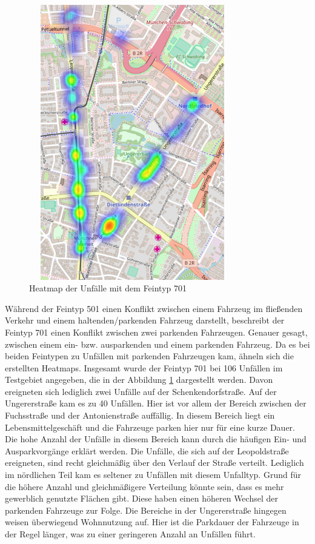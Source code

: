 \begin{savenotes}
	\begin{figure}[H]
		\centering
		\includegraphics[width=9cm,height=12cm]{figures/HM_701}
		\caption[Heatmap der Unfälle mit dem Feintyp 701]{Heatmap der Unfälle mit dem Feintyp 701}\label{fig:Heatmap_701}
	\end{figure}
\end{savenotes}

Während der Feintyp 501 einen Konflikt zwischen einem Fahrzeug im fließenden Verkehr und einem haltenden/parkenden Fahrzeug darstellt, beschreibt der Feintyp 701 einen Konflikt zwischen zwei parkenden Fahrzeugen. Genauer gesagt, zwischen einem ein- bzw. ausparkenden und einem parkenden Fahrzeug. Da es bei beiden Feintypen zu Unfällen mit parkenden Fahrzeugen kam, ähneln sich die erstellten Heatmaps. Insgesamt wurde der Feintyp 701 bei 106 Unfällen im Testgebiet angegeben, die in der Abbildung \ref{fig:Heatmap_701} dargestellt werden. Davon ereigneten sich lediglich zwei Unfälle auf der Schenkendorfstraße. Auf der Ungererstraße kam es zu 40 Unfällen. Hier ist vor allem der Bereich zwischen der Fuchsstraße und der Antonienstraße auffällig. In diesem Bereich liegt ein Lebensmittelgeschäft und die Fahrzeuge parken hier nur für eine kurze Dauer. Die hohe Anzahl der Unfälle in diesem Bereich kann durch die häufigen Ein- und Ausparkvorgänge erklärt werden. Die Unfälle, die sich auf der Leopoldstraße ereigneten, sind recht gleichmäßig über den Verlauf der Straße verteilt. Lediglich im nördlichen Teil kam es seltener zu Unfällen mit diesem Unfalltyp. Grund für die höhere Anzahl und gleichmäßigere Verteilung könnte sein, dass es mehr gewerblich genutzte Flächen gibt. Diese haben einen höheren Wechsel der parkenden Fahrzeuge zur Folge. Die Bereiche in der Ungererstraße hingegen weisen überwiegend Wohnnutzung auf. Hier ist die Parkdauer der Fahrzeuge in der Regel länger, was zu einer geringeren Anzahl an Unfällen führt. 

